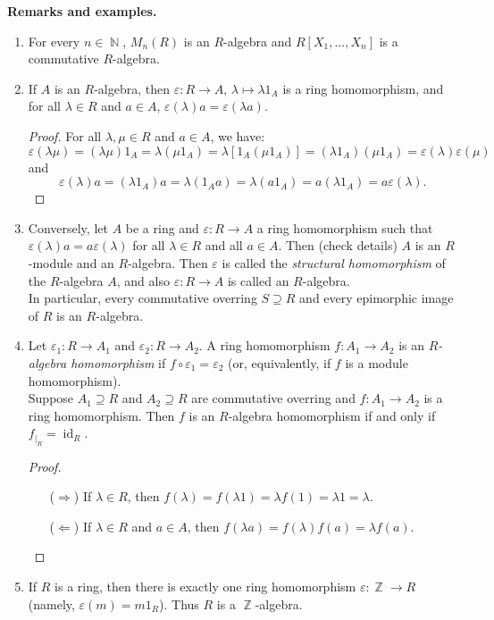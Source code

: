 \documentclass[12pt,a4paper]{report}
\theoremstyle{definition}
\theoremstyle{num.custom-title}
\DeclareMathOperator{\id}{id}
\DeclareMathOperator{\N}{\mathbb{N}}
\DeclareMathOperator{\Z}{\mathbb{Z}}
\DeclareMathOperator{\imp}{\Rightarrow}
\DeclareMathOperator{\pmi}{\Leftarrow}
\renewcommand{\epsilon}{\varepsilon}
\begin{document}
\noindent\textbf{Remarks and examples.}
\begin{enumerate}
\item For every $n \in \N$, $M_n(R)$ is an $R$-algebra and $R[X_1,...,X_n]$ is a commutative $R$-algebra.
\item If $A$ is an $R$-algebra, then $\epsilon : R \to A$, $\lambda \mapsto \lambda 1_A$ is a ring homomorphism, and for all $\lambda \in R$ and $a \in A$, $\epsilon(\lambda) a = \epsilon(\lambda a)$.
\begin{proof}
For all $\lambda, \mu \in R$ and $a \in A$, we have:
\[
\epsilon(\lambda\mu) = (\lambda\mu) 1_A = \lambda(\mu 1_A) = \lambda [1_A (\mu 1_A)] = (\lambda 1_A)(\mu 1_A) = \epsilon(\lambda) \epsilon(\mu)
\]
and
\[
\epsilon(\lambda) a = (\lambda 1_A) a = \lambda (1_A a) = \lambda (a 1_A) = a (\lambda 1_A) = a \epsilon(\lambda).
\]
\end{proof}
\item Conversely, let $A$ be a ring and $\epsilon : R \to A$ a ring homomorphism such that $\epsilon(\lambda)a = a \epsilon(\lambda)$ for all $\lambda \in R$ and all $a \in A$. Then (check details) $A$ is an $R$-module and an $R$-algebra. Then $\epsilon$ is called the \emph{structural homomorphism} of the $R$-algebra $A$, and also $\epsilon : R \to A$ is called an $R$-algebra.\\
In particular, every commutative overring $S \supseteq R$ and every epimorphic image of $R$ is an $R$-algebra.
\item Let $\epsilon_1 : R \to A_1$ and $\epsilon_2 : R \to A_2$. A ring homomorphism $f: A_1 \to A_2$ is an $R$\emph{-algebra homomorphism} if $f \circ \epsilon_1 = \epsilon_2$ (or, equivalently, if $f$ is a module homomorphism).\\
Suppose $A_1 \supseteq R$ and $A_2 \supseteq R$ are commutative overring and $f : A_1 \to A_2$ is a ring homomorphism. Then $f$ is an $R$-algebra homomorphism if and only if $f_{|_R}=\id_R$.
\begin{proof}
\begin{itemize}
\item[($\imp$)] If $\lambda \in R$, then $f(\lambda) = f(\lambda 1) = \lambda f(1) = \lambda 1 = \lambda$.
\item[($\pmi$)] If $\lambda \in R$ and $a \in A$, then $f(\lambda a) = f(\lambda) f(a) = \lambda f(a)$.
\end{itemize}
\end{proof}
\item If $R$ is a ring, then there is exactly one ring homomorphism $\epsilon : \Z \to R$ (namely, $\epsilon(m)=m 1_R$). Thus $R$ is a $\Z$-algebra.
\end{enumerate}
\end{document}
